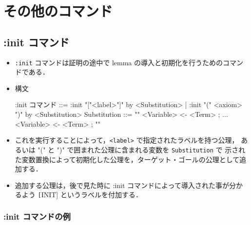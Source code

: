 \documentclass[a4paper,oneside,10pt,here]{memoir}
\def\SP{\mathit{SP}}
\newenvironment{vvtm}%
{\parskip=0pt\lineskip=0pt\begin{center}\begin{minipage}{0.8\textwidth}\begin{snugshade}}%
  {\end{snugshade}\end{minipage}\end{center}}
\begin{document}


\section{その他のコマンド}\label{sec:other-commands}

\subsection{:init コマンド} 

\begin{itemize}
\item \verb|:init| コマンドは証明の途中で lemma の導入と初期化を行うためのコマンドである．
\item 構文
  \begin{vvtm}
    \begin{simplev}
 :init コマンド ::= :init "["<label>"]" by <Substitution>
                 |  :init "(" <axiom> ")" by <Substitution>
 Substitution ::= "{" <Variable> <- <Term> ; ... <Variable> <- <Term> ; "}"
    \end{simplev}
  \end{vvtm}
\item これを実行することによって，\verb|<label>| で指定されたラベルを持つ公理，
  あるいは "(" と ")" で囲まれた公理に含まれる変数を \verb|Substitution| で
  示された変数置換によって初期化した公理を，ターゲット・ゴールの公理として追加する．
\item 追加する公理は，後で見た時に :init コマンドによって導入された事が分かるよう
 \texttt[INIT] というラベルを付加する．
\end{itemize}

\subsubsection{:init コマンドの例}
\end{document}
